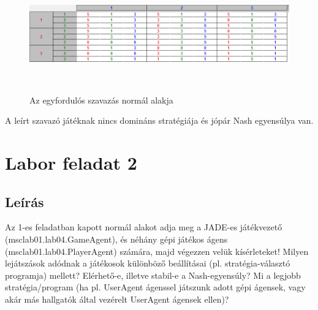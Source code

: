 \begin{figure}[h]
\begin{center}
\includegraphics[height=5cm]{figures/voting_small2.png}
\caption{Az egyfordulós szavazás normál alakja}
\end{center}
\end{figure}
A leírt szavazó játéknak nincs domináns stratégiája és jópár Nash egyensúlya van.

\section{Labor feladat 2}
\subsection{Leírás}
Az 1-es feladatban kapott normál alakot adja meg a JADE-es játékvezető (msclab01.lab04.GameAgent), és néhány gépi játékos ágens (msclab01.lab04.PlayerAgent) számára, majd végezzen velük kísérleteket! Milyen lejátszások adódnak a játékosok különböző beállításai (pl. stratégia-választó programja) mellett? Elérhető-e, illetve stabil-e a Nash-egyensúly? Mi a legjobb stratégia/program (ha pl. UserAgent ágenssel játszunk adott gépi ágensek, vagy akár más hallgatók által vezérelt UserAgent ágensek ellen)? 
